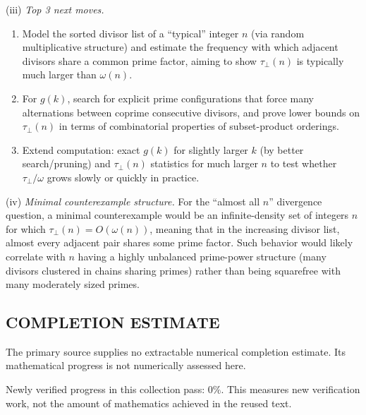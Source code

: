 \smallskip
\noindent
(iii) \emph{Top 3 next moves.}
\begin{enumerate}
\item Model the sorted divisor list of a ``typical'' integer $n$ (via random multiplicative structure) and estimate the frequency with which adjacent divisors share a common prime factor, aiming to show $\tau_\perp(n)$ is typically much larger than $\omega(n)$.
\item For $g(k)$, search for explicit prime configurations that force many alternations between coprime consecutive divisors, and prove lower bounds on $\tau_\perp(n)$ in terms of combinatorial properties of subset-product orderings.
\item Extend computation: exact $g(k)$ for slightly larger $k$ (by better search/pruning) and $\tau_\perp(n)$ statistics for much larger $n$ to test whether $\tau_\perp/\omega$ grows slowly or quickly in practice.
\end{enumerate}

\smallskip
\noindent
(iv) \emph{Minimal counterexample structure.}
For the ``almost all $n$'' divergence question, a minimal counterexample would be an infinite-density set of integers $n$ for which $\tau_\perp(n)=O(\omega(n))$, meaning that in the increasing divisor list, almost every adjacent pair shares some prime factor. Such behavior would likely correlate with $n$ having a highly unbalanced prime-power structure (many divisors clustered in chains sharing primes) rather than being squarefree with many moderately sized primes.



\subsection*{COMPLETION ESTIMATE}
The primary source supplies no extractable numerical completion estimate. Its mathematical progress is not numerically assessed here.

Newly verified progress in this collection pass: $0\%$. This measures new verification work, not the amount of mathematics achieved in the reused text.
